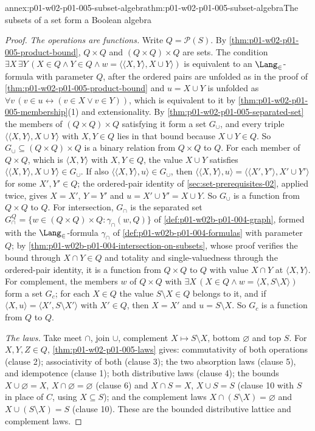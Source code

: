 \begin{annexitem}{annex:p01-w02-p01-005-subset-algebra}{thm:p01-w02-p01-005-subset-algebra}{The subsets of a set form a Boolean algebra}
\begin{proof}
\emph{The operations are functions.} Write \(Q=\mathcal P(S)\). By
\cref{thm:p01-w02-p01-005-product-bound}, \(Q\times Q\) and
\((Q\times Q)\times Q\) are sets. The condition
\(\exists X\,\exists Y\,(X\in Q\land Y\in Q\land
w=\langle\langle X,Y\rangle,X\cup Y\rangle)\) is equivalent to an
\(\Lang_{\in}\)-formula with parameter \(Q\), after the ordered pairs are
unfolded as in the proof of \cref{thm:p01-w02-p01-005-product-bound} and
\(u=X\cup Y\) is unfolded as
\(\forall v\,(v\in u\leftrightarrow(v\in X\lor v\in Y))\), which is
equivalent to it by \cref{thm:p01-w02-p01-005-membership}(1) and
extensionality. By \cref{thm:p01-w02-p01-005-separated-set} the members of
\((Q\times Q)\times Q\) satisfying it form a set \(G_{\cup}\), and every triple
\(\langle\langle X,Y\rangle,X\cup Y\rangle\) with \(X,Y\in Q\) lies in that
bound because \(X\cup Y\in Q\). So \(G_{\cup}\subseteq(Q\times Q)\times Q\) is a
binary relation from \(Q\times Q\) to \(Q\). For each member of \(Q\times Q\),
which is \(\langle X,Y\rangle\) with \(X,Y\in Q\), the value \(X\cup Y\)
satisfies \(\langle\langle X,Y\rangle,X\cup Y\rangle\in G_{\cup}\). If also
\(\langle\langle X,Y\rangle,u\rangle\in G_{\cup}\), then
\(\langle\langle X,Y\rangle,u\rangle=\langle\langle X',Y'\rangle,X'\cup Y'\rangle\)
for some \(X',Y'\in Q\); the ordered-pair identity of
\cref{sec:set-prerequisites-02}, applied twice, gives \(X=X'\), \(Y=Y'\) and
\(u=X'\cup Y'=X\cup Y\). So \(G_{\cup}\) is a function from \(Q\times Q\) to
\(Q\). For intersection, \(G_{\cap}\) is the separated set
\(G^{Q}_{\cap}=\{w\in(Q\times Q)\times Q:\gamma_{\cap}(w,Q)\}\) of
\cref{def:p01-w02b-p01-004-graph}, formed with the \(\Lang_{\in}\)-formula
\(\gamma_{\cap}\) of \cref{def:p01-w02b-p01-004-formulas} with parameter
\(Q\); by \cref{thm:p01-w02b-p01-004-intersection-on-subsets}, whose proof
verifies the bound through \(X\cap Y\in Q\) and totality and
single-valuedness through the ordered-pair identity, it is a function from
\(Q\times Q\) to \(Q\) with value \(X\cap Y\) at \(\langle X,Y\rangle\). For
complement, the members \(w\) of \(Q\times Q\) with
\(\exists X\,(X\in Q\land w=\langle X,S\setminus X\rangle)\) form a set
\(G_{c}\); for each \(X\in Q\) the value \(S\setminus X\in Q\) belongs to it,
and if \(\langle X,u\rangle=\langle X',S\setminus X'\rangle\) with \(X'\in Q\),
then \(X=X'\) and \(u=S\setminus X\). So \(G_{c}\) is a function from \(Q\) to
\(Q\).

\emph{The laws.} Take meet \(\cap\), join \(\cup\), complement
\(X\mapsto S\setminus X\), bottom \(\varnothing\) and top \(S\). For
\(X,Y,Z\in Q\), \cref{thm:p01-w02-p01-005-laws} gives: commutativity of both
operations (clause 2); associativity of both (clause 3); the two absorption
laws (clause 5), and idempotence (clause 1); both distributive laws
(clause 4); the bounds \(X\cup\varnothing=X\), \(X\cap\varnothing=\varnothing\)
(clause 6) and \(X\cap S=X\), \(X\cup S=S\) (clause 10 with \(S\) in place of
\(C\), using \(X\subseteq S\)); and the complement laws
\(X\cap(S\setminus X)=\varnothing\) and \(X\cup(S\setminus X)=S\) (clause 10).
These are the bounded distributive lattice and complement laws.


\end{proof}
\end{annexitem}
